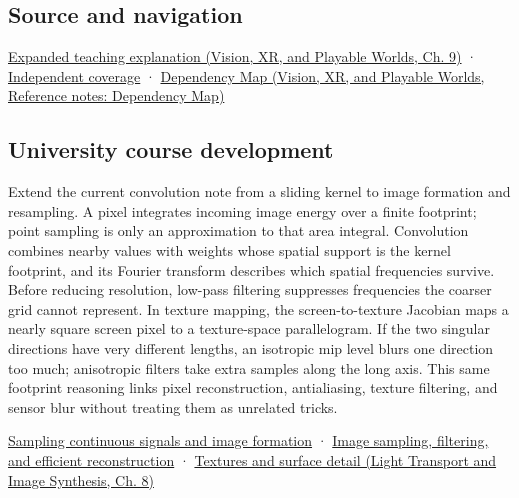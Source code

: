 \subsection{Source and navigation}\label{appendix-d5b3c692d9f0-source-and-navigation}

\hypertarget{appendix-d5b3c692d9f0-source-and-navigation}{}

\href{../07-Vision-XR-and-Playable-Worlds/main.pdf\#nameddest=04-visual-computing-ii-ch042-a-footprint-is-more-meaningful-than-an-isolated-pixel-center}{Expanded teaching explanation (Vision, XR, and Playable Worlds, Ch. 9)} · \hyperref[appendix-fd090d982a15-xr01---independent-seeing-and-representation-source]{Independent coverage} · \href{../07-Vision-XR-and-Playable-Worlds/main.pdf\#nameddest=appendix-4ad47bdd269a}{Dependency Map (Vision, XR, and Playable Worlds, Reference notes: Dependency Map)}

\subsection{University course development}\label{appendix-d5b3c692d9f0-university-course-development}

\hypertarget{appendix-d5b3c692d9f0-university-course-development}{}

Extend the current convolution note from a sliding kernel to image formation and resampling. A pixel integrates incoming image energy over a finite footprint; point sampling is only an approximation to that area integral. Convolution combines nearby values with weights whose spatial support is the kernel footprint, and its Fourier transform describes which spatial frequencies survive. Before reducing resolution, low-pass filtering suppresses frequencies the coarser grid cannot represent. In texture mapping, the screen-to-texture Jacobian maps a nearly square screen pixel to a texture-space parallelogram. If the two singular directions have very different lengths, an isotropic mip level blurs one direction too much; anisotropic filters take extra samples along the long axis. This same footprint reasoning links pixel reconstruction, antialiasing, texture filtering, and sensor blur without treating them as unrelated tricks.

\hyperref[03-visual-computing-i-ch003-sampling-continuous-signals-and-image-formation]{Sampling continuous signals and image formation} · \hyperref[03-visual-computing-i-ch004-image-sampling-filtering-and-efficient-reconstruction]{Image sampling, filtering, and efficient reconstruction} · \href{../04-Light-Transport-and-Image-Synthesis/main.pdf\#nameddest=03-visual-computing-i-ch019-textures-and-surface-detail}{Textures and surface detail (Light Transport and Image Synthesis, Ch. 8)}
